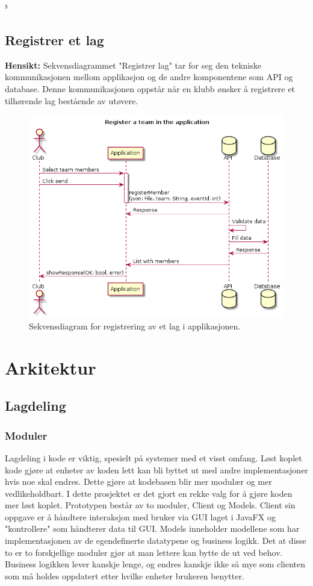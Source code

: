 ⁵\documentclass[norsk]{article}
\begin{document}
\subsection{Registrer et lag}
\textbf{Hensikt:} Sekvensdiagrammet "Registrer lag" tar for seg den tekniske kommunikasjonen mellom applikasjon og de andre komponentene som API og database. Denne kommunikasjonen oppstår når en klubb ønsker å registrere et tilhørende lag bestående av utøvere. 
\begin{figure}[H]
\centering
    \includegraphics[scale=0.5]{images/register-team.png}
    \caption{Sekvensdiagram for registrering av et lag i applikasjonen.}\label{fig:register-team}
\end{figure}

\section{Arkitektur}
\subsection{Lagdeling}
\subsubsection{Moduler}
Lagdeling i kode er viktig, spesielt på systemer med et visst omfang. Løst koplet kode gjøre at enheter av koden lett kan bli byttet ut med andre implementasjoner hvis noe skal endres. Dette gjøre at kodebasen blir mer modulær og mer vedlikeholdbart.
I dette prosjektet er det gjort en rekke valg for å gjøre koden mer løst koplet.
Prototypen består av to moduler, Client og Models. Client sin oppgave er å håndtere interaksjon med bruker via GUI laget i JavaFX og "kontrollere" som håndterer data til GUI.
Models inneholder modellene som har implementasjonen av de egendefinerte datatypene og business logikk.
Det at disse to er to forskjellige moduler gjør at man lettere kan bytte de ut ved behov. Business logikken lever kanskje lenge, og endres kanskje ikke så mye som clienten som må holdes oppdatert etter hvilke enheter brukeren benytter.
\end{document}
